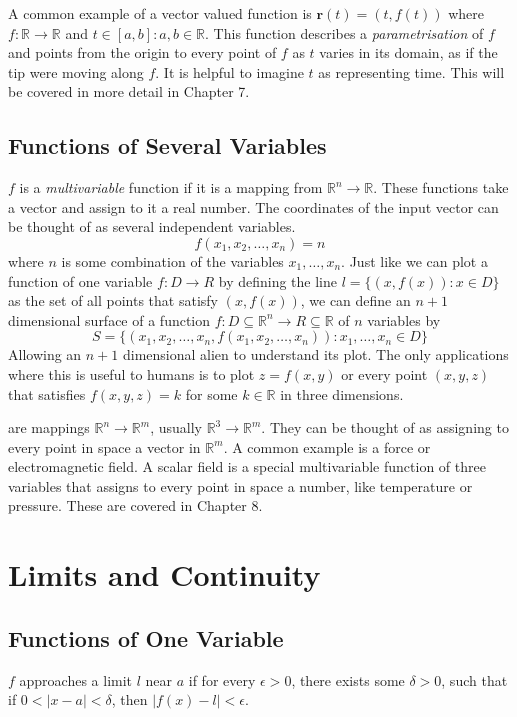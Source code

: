 \documentclass[10pt]{book}
\newcommand{\newthought}[1]{\vspace{0.5\baselineskip}\noindent{\scshape #1}}
\begin{document}
A common example of a vector valued
function is $\mathbf{r}(t)=(t,f(t))$ where $f:\mathbb{R} \to \mathbb{R}$ and $t\in[a,b] : a,b\in\mathbb{R}$.
This function describes a
\emph{parametrisation} of $f$ and points from the origin to every point of $f$ as $t$ varies in its domain,
as if the tip were moving
along $f$. It is helpful to imagine $t$ as representing time. This will be covered in more detail in Chapter 7.

\section{Functions of Several Variables}
\newthought{A function} $f$ is a \emph{multivariable} function if it is a mapping from $\mathbb{R}^n \to
\mathbb{R}$. These functions take a
vector and assign to it a real number. The coordinates of the input vector can be thought of as several
independent variables.
\[f(x_1,x_2,\ldots,x_n) = n\]
where $n$ is some combination of the variables $x_1, \ldots, x_n$. Just like we can plot a function of one
variable $f: D \to R$ by defining
the line
$l = \{(x,f(x)) : x \in D\}$
as the set of all points that satisfy $(x,f(x))$, we can define an $n+1$ dimensional surface of a function
$f: D \subseteq \mathbb{R}^n \to R \subseteq \mathbb{R}$ of $n$ variables by
\[S = \{(x_1,x_2,\ldots,x_n,f(x_1,x_2,\ldots,x_n)) : x_1, \ldots, x_n \in D\}\]
Allowing an $n+1$ dimensional alien to understand its plot. The only applications where this is useful to
humans is to plot $z = f(x,y)$
or every point $(x,y,z)$ that satisfies $f(x,y,z) = k$ for some $k \in \mathbb{R}$ in three dimensions.

\newthought{Fields} are mappings $\mathbb{R}^n \to \mathbb{R}^m$, usually $\mathbb{R}^3 \to \mathbb{R}^m$.
They can be thought of as
assigning to every point in space a vector in $\mathbb{R}^m$. A common example is a force or electromagnetic
field. A scalar field is a
special multivariable function of three variables that assigns to every point in space a number, like
temperature or pressure. These are
covered in Chapter 8.

\chapter{Limits and Continuity}
\section{Functions of One Variable}
\newthought{A function} $f$ approaches a limit $l$ near $a$ if for every $\epsilon > 0$, there exists some
$\delta > 0$, such
that if $ 0 < |x-a| < \delta$,
then $|f(x)-l|<\epsilon$.
\end{document}
